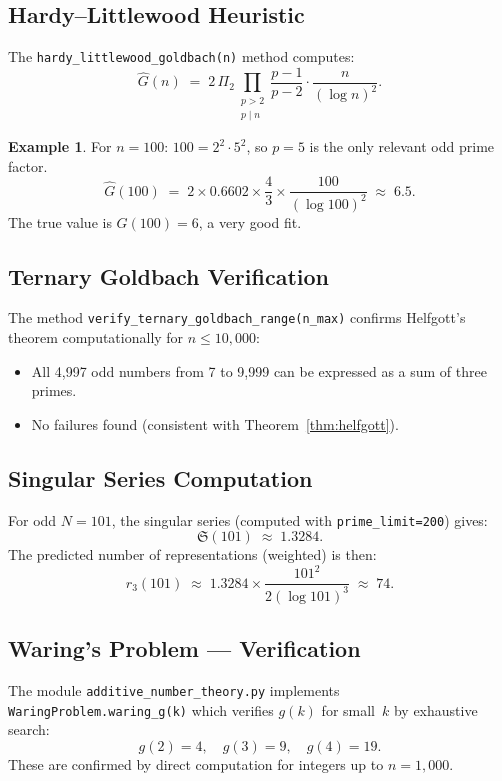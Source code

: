 \documentclass[12pt,a4paper]{amsart}
\theoremstyle{definition}
\newtheorem{example}[theorem]{Example}
\begin{document}
\subsection{Hardy--Littlewood Heuristic}

The \texttt{hardy\_littlewood\_goldbach(n)} method computes:
\[
  \widehat{G}(n) \;=\; 2\,\Pi_2
  \prod_{\substack{p > 2 \\ p \mid n}} \frac{p-1}{p-2}
  \cdot \frac{n}{(\log n)^2}.
\]

\begin{example}
For $n = 100$: $100 = 2^2 \cdot 5^2$, so $p = 5$ is the only relevant
odd prime factor.
\[
  \widehat{G}(100) \;=\; 2 \times 0.6602 \times \frac{4}{3} \times
  \frac{100}{(\log 100)^2} \;\approx\; 6.5.
\]
The true value is $G(100) = 6$, a very good fit.
\end{example}

\subsection{Ternary Goldbach Verification}

The method \texttt{verify\_ternary\_goldbach\_range(n\_max)} confirms
Helfgott's theorem computationally for $n \leq 10{,}000$:
\begin{itemize}
\item All 4{,}997 odd numbers from 7 to 9{,}999 can be expressed as
      a sum of three primes.
\item No failures found (consistent with Theorem~\ref{thm:helfgott}).
\end{itemize}

\subsection{Singular Series Computation}

For odd $N = 101$, the singular series (computed with \texttt{prime\_limit=200}) gives:
\[
  \mathfrak{S}(101) \;\approx\; 1.3284.
\]
The predicted number of representations (weighted) is then:
\[
  r_3(101) \;\approx\; 1.3284 \times \frac{101^2}{2 (\log 101)^3}
  \;\approx\; 74.
\]

\subsection{Waring's Problem --- Verification}

The module \texttt{additive\_number\_theory.py} implements
\texttt{WaringProblem.waring\_g(k)} which verifies $g(k)$ for small~$k$
by exhaustive search:
\[
  g(2) = 4,\quad g(3) = 9,\quad g(4) = 19.
\]
These are confirmed by direct computation for integers up to
$n = 1{,}000$.
\end{document}
